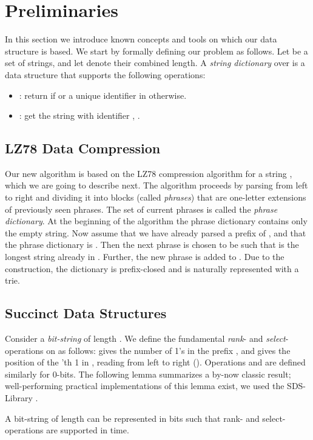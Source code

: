 \documentclass{llncs}
\begin{document}
\section{Preliminaries}
\label{sect:prelims}
In this section we introduce known concepts and tools on which our data structure is based. We start by formally defining our problem as follows. Let  be a set of  strings, and let  denote their combined length. A \emph{string dictionary} over  is a data structure that supports the following operations:
\begin{itemize}
\item : return  if  or a unique identifier in  otherwise.
\item : get the string with identifier , .
\end{itemize}

\subsection{LZ78 Data Compression}
\label{sect:lz}
Our new algorithm is based on the LZ78 compression algorithm \cite{ziv78compression} for a string , which we are going to describe next. The algorithm proceeds by parsing  from left to right and dividing it into blocks (called \emph{phrases}) that are one-letter extensions of previously seen phrases. The set of current phrases is called the \emph{phrase dictionary}. At the beginning of the algorithm the phrase dictionary contains only the empty string. Now assume that we have already parsed a prefix  of , and that the phrase dictionary is . Then the next phrase is chosen to be  such that  is the longest string already in . Further, the new phrase  is added to . Due to the construction, the dictionary  is prefix-closed and is naturally represented with a trie.

\subsection{Succinct Data Structures}
\label{sect:succinct}

Consider a \emph{bit-string}  of
length . We define the fundamental \emph{rank}- and \emph{select}-operations on  as follows:
 gives the number of 1's in the prefix , and  gives the
position of the 'th 1 in , reading  from left to right (). Operations
 and  are defined similarly for 0-bits. The following lemma summarizes
a by-now classic result; well-performing practical implementations of this lemma exist, we used the SDS-Library \cite{sdsl}.
\begin{lemma}
\label{lem:fid}
A bit-string of length  can be represented in  bits such that rank- and select-operations are supported in  time.
\end{lemma}
\end{document}
